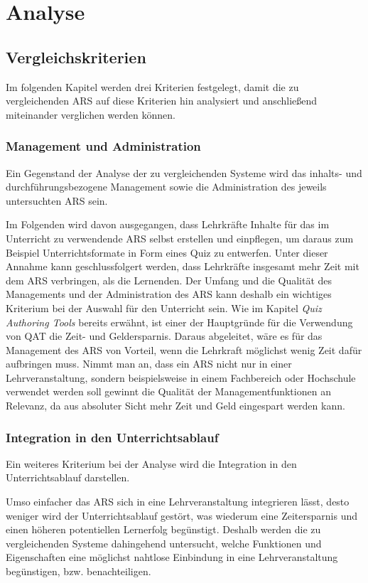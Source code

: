 \documentclass[conference]{IEEEtran}
\begin{document}
\section{Analyse}

\subsection{Vergleichskriterien}
Im folgenden Kapitel werden drei Kriterien festgelegt, damit die zu vergleichenden ARS auf diese Kriterien hin analysiert und anschließend miteinander verglichen werden können.
\\
\subsubsection{Management und Administration} 
Ein Gegenstand der Analyse der zu vergleichenden Systeme wird das inhalts- und durchführungsbezogene Management sowie die Administration des jeweils untersuchten ARS sein.

Im Folgenden wird davon ausgegangen, dass Lehrkräfte Inhalte für das im Unterricht zu verwendende ARS selbst erstellen und einpflegen, um daraus zum Beispiel Unterrichtsformate in Form eines Quiz zu entwerfen. Unter dieser Annahme kann geschlussfolgert werden, dass Lehrkräfte insgesamt mehr Zeit mit dem ARS verbringen, als die Lernenden. Der Umfang und die Qualität des Managements und der Administration des ARS kann deshalb ein wichtiges Kriterium bei der Auswahl für den Unterricht sein. Wie im Kapitel \emph{Quiz Authoring Tools} bereits erwähnt, ist einer der Hauptgründe für die Verwendung von QAT die Zeit- und Geldersparnis. Daraus abgeleitet, wäre es für das Management des ARS von Vorteil, wenn die Lehrkraft möglichst wenig Zeit dafür aufbringen muss. Nimmt man an, dass ein ARS nicht nur in einer Lehrveranstaltung, sondern beispielsweise in einem Fachbereich oder Hochschule verwendet werden soll gewinnt die Qualität der Managementfunktionen an Relevanz, da aus absoluter Sicht mehr Zeit und Geld eingespart werden kann. 
\\
\subsubsection{Integration in den Unterrichtsablauf}
Ein weiteres Kriterium bei der Analyse wird die Integration in den Unterrichtsablauf darstellen.

Umso einfacher das ARS sich in eine Lehrveranstaltung integrieren lässt, desto weniger wird der Unterrichtsablauf gestört, was wiederum eine Zeitersparnis und einen höheren potentiellen Lernerfolg begünstigt. Deshalb werden die zu vergleichenden Systeme dahingehend untersucht, welche Funktionen und Eigenschaften eine möglichst nahtlose Einbindung in eine Lehrveranstaltung begünstigen, bzw. benachteiligen.
\\
\end{document}

